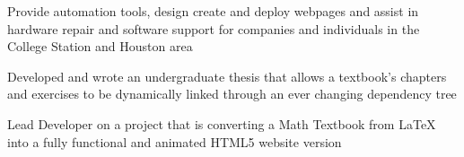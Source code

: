 \documentclass[letterpaper]{deedy-resume} %
\begin{document}
\begin{minipage}[t]{0.66\textwidth}
\sectionspace %



\begin{tightitemize}
\item Provide automation tools, design create and deploy webpages and assist in hardware repair and software support for companies and individuals in the College Station and Houston area
\end{tightitemize}

\sectionspace %



\begin{tightitemize}
\item Developed and wrote an undergraduate thesis that
allows a textbook's chapters and exercises to be dynamically
linked through an ever changing dependency tree

\item Lead Developer on a project that is converting a Math Textbook from \LaTeX \hspace*{0.3mm} into a fully functional and animated HTML5 website version
\end{tightitemize}

\sectionspace %





\end{minipage}
\end{document}
